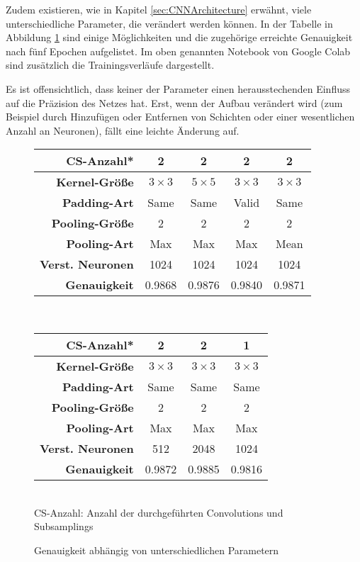 \documentclass[12pt,a4]{article}
\begin{document}
Zudem existieren, wie in Kapitel \ref{sec:CNNArchitecture} erwähnt, viele unterschiedliche Parameter, die verändert werden können. In der Tabelle in Abbildung \ref{fig:TrainingParameters} sind einige Möglichkeiten und die zugehörige erreichte Genauigkeit nach fünf Epochen aufgelistet. Im oben genannten Notebook von Google Colab sind zusätzlich die Trainingsverläufe dargestellt.

Es ist offensichtlich, dass keiner der Parameter einen herausstechenden Einfluss auf die Präzision des Netzes hat. Erst, wenn der Aufbau verändert wird (zum Beispiel durch Hinzufügen oder Entfernen von Schichten oder einer wesentlichen Anzahl an Neuronen), fällt eine leichte Änderung auf.
\clearpage

\begin{figure}[!h]
\centering
\begin{tabular}{| r || c | c | c | c |}
\hline
\textbf{CS-Anzahl*} & 2 & 2 & 2 & 2 \\\hline\hline
\textbf{Kernel-Größe} & $3 \times 3$ & $5 \times 5$ & $3 \times 3$ & $3 \times 3$ \\\hline
\textbf{Padding-Art} & Same & Same & Valid & Same \\\hline\hline
\textbf{Pooling-Größe} & 2 & 2 & 2 & 2 \\\hline
\textbf{Pooling-Art} & Max & Max & Max & Mean \\\hline\hline
\textbf{Verst. Neuronen} & 1024 & 1024 & 1024 & 1024 \\\hline\hline
\textbf{Genauigkeit} & 0.9868 & 0.9876 & 0.9840 & 0.9871 \\\hline
\end{tabular}\\[5pt]
\begin{tabular}{| r || c | c | c|}
\hline
\textbf{CS-Anzahl*} & 2 & 2 & 1 \\\hline\hline
\textbf{Kernel-Größe} & $3 \times 3$ & $3 \times 3$ & $3 \times 3$ \\\hline
\textbf{Padding-Art} & Same & Same & Same \\\hline\hline
\textbf{Pooling-Größe} & 2 & 2 & 2 \\\hline
\textbf{Pooling-Art} & Max & Max & Max \\\hline\hline
\textbf{Verst. Neuronen} & 512 & 2048 & 1024 \\\hline\hline
\textbf{Genauigkeit} & 0.9872 & 0.9885 & 0.9816 \\\hline
\end{tabular}\\[5pt]
{\small *CS-Anzahl: Anzahl der durchgeführten Convolutions und Subsamplings}
\caption{Genauigkeit abhängig von unterschiedlichen Parametern}
\label{fig:TrainingParameters}
\end{figure}
\end{document}
